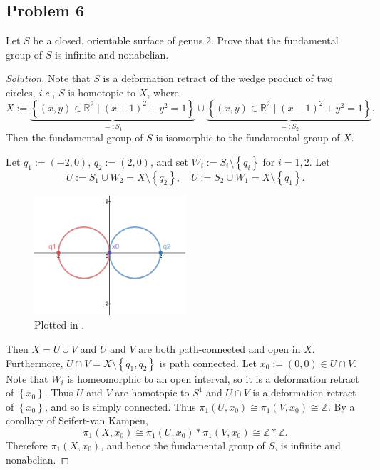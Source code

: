 \documentclass[12pt]{article}
\newcommand{\z}{\mathbb{Z}}
\newcommand{\real}{\mathbb{R}}
\newcommand{\ita}[1]{\textit{#1}}
\newcommand\setb[1]{\left \{ #1 \right \}}
\theoremstyle{definition}
\begin{document}
\subsection{Problem 6 \texorpdfstring{\cite{Munkres,Desmos}}{}}
Let $S$ be a closed, orientable surface of genus 2. Prove that the fundamental group of $S$ is infinite and nonabelian.
\begin{proof}[Solution]
    Note that $S$ is a deformation retract of the wedge product of two circles, \ita{i.e.}, $S$ is homotopic to $X$, where 
    \[
        X := \underbrace{ \setb{ (x,y) \in \real^2 \mid (x+1)^2 + y^2 = 1 } }_{ =: S_1 } \cup \underbrace{ \setb{ (x,y) \in \real^2 \mid (x-1)^2 + y^2 = 1 } }_{ =: S_2 }.
    \]
    Then the fundamental group of $S$ is isomorphic to the fundamental group of $X$.
    
    Let $q_1 := (-2,0)$, $q_2 := (2,0)$, and set $W_i := S_i \setminus \setb{ q_i }$ for $i = 1 , 2$. Let 
    \[
        U := S_1 \cup W_2 = X \setminus \setb{ q_2 } , \quad U := S_2 \cup W_1 = X \setminus \setb{ q_1 }.
    \]
    \begin{figure}[H]
        \centering
        \includegraphics[width = 0.5\textwidth]{1.png}
        \caption{Plotted in \cite{Desmos}.}
        \label{fig:fig1}
    \end{figure}
    Then $X = U \cup V$ and $U$ and $V$ are both path-connected and open in $X$. Furthermore, $U \cap V = X \setminus \setb{ q_1 , q_2 }$ is path connected. Let $x_0 := (0,0) \in U \cap V$. Note that $W_i$ is homeomorphic to an open interval, so it is a deformation retract of $\setb{ x_0 }$. Thus $U$ and $V$ are homotopic to $S^1$ and $U \cap V$ is a deformation retract of $\setb{ x_0 }$, and so is simply connected. Thus $\pi_1(U,x_0) \cong \pi_1(V,x_0) \cong \z$. By a corollary of Seifert-van Kampen, 
    \[
        \pi_1(X,x_0) \cong \pi_1(U,x_0) \ast \pi_1(V,x_0) \cong \z \ast \z.
    \]
    Therefore $\pi_1(X,x_0)$, and hence the fundamental group of $S$, is infinite and nonabelian.
\end{proof}
\newpage
\end{document}
